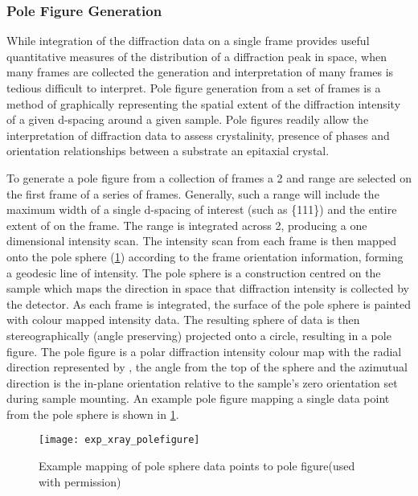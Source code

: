\subsubsection{Pole Figure Generation} While integration of the diffraction data on a single frame provides useful quantitative measures of the distribution of a diffraction peak in space, when many frames are collected the generation and interpretation of many frames is tedious difficult to interpret.
Pole figure generation from a set of frames is a method of graphically representing the spatial extent of the diffraction intensity of a given d-spacing around a given sample.
Pole figures readily allow the interpretation of diffraction data to assess crystalinity, presence of phases and orientation relationships between a substrate an epitaxial crystal.

To generate a pole figure from a collection of frames a 2\straighttheta{} and \textchi{} range are selected on the first frame of a series of frames.
Generally, such a range will include the maximum width of a single d-spacing of interest (such as \{111\}) and the entire extent of \textchi{} on the frame.
The range is integrated across 2\straighttheta{}, producing a one dimensional intensity scan.
The intensity scan from each frame is then mapped onto the pole sphere (\cref{fig:exp_xray_polefigure}) according to the frame orientation information, forming a geodesic line of intensity.
The pole sphere is a construction centred on the sample which maps the direction in space that diffraction intensity is collected by the detector.
As each frame is integrated, the surface of the pole sphere is painted with colour mapped intensity data.
The resulting sphere of data is then stereographically (angle preserving) projected onto a circle, resulting in a pole figure\cite{He2009}.
The pole figure is a polar diffraction intensity colour map with the radial direction represented by \textalpha{}, the angle from the top of the sphere and the azimutual direction \textphi{} is the in-plane orientation relative to the sample's \textphi{} zero orientation set during sample mounting.
An example pole figure mapping a single data point from the pole sphere is shown in \cref{fig:exp_xray_polefigure}.
\begin{figure}
 \centering \texttt{[image: exp\_xray\_polefigure]}
 \caption[Mapping of pole sphere to pole figure]{\label{fig:exp_xray_polefigure}Example mapping of pole sphere data points to pole figure\cite{He2009}(used with permission)}
\end{figure}

